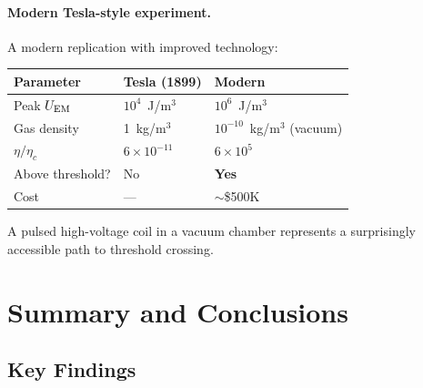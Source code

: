 \documentclass[12pt,a4paper]{article}
\begin{document}
\paragraph{Modern Tesla-style experiment.}
A modern replication with improved technology:
\begin{center}
\begin{tabular}{lll}
\toprule
Parameter & Tesla (1899) & Modern \\
\midrule
Peak $U_{\rm EM}$ & $10^4$~J/m$^3$ & $10^6$~J/m$^3$ \\
Gas density & 1~kg/m$^3$ & $10^{-10}$~kg/m$^3$ (vacuum) \\
$\eta/\eta_c$ & $6 \times 10^{-11}$ & $6 \times 10^5$ \\
Above threshold? & No & \textbf{Yes} \\
Cost & --- & $\sim$\$500K \\
\bottomrule
\end{tabular}
\end{center}

A pulsed high-voltage coil in a vacuum chamber represents a surprisingly
accessible path to threshold crossing.

\section{Summary and Conclusions}
\label{sec:conclusions}

\subsection{Key Findings}
\end{document}
